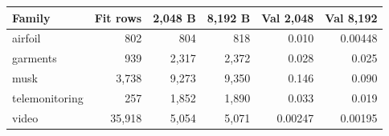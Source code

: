 \begin{tabular}{@{}lrrrrr@{}}
\toprule
Family & Fit rows & 2{,}048 B & 8{,}192 B & Val 2{,}048 & Val 8{,}192 \\
\midrule
airfoil & 802 & 804 & 818 & 0.010 & 0.00448 \\
garments & 939 & 2{,}317 & 2{,}372 & 0.028 & 0.025 \\
musk & 3{,}738 & 9{,}273 & 9{,}350 & 0.146 & 0.090 \\
telemonitoring & 257 & 1{,}852 & 1{,}890 & 0.033 & 0.019 \\
video & 35{,}918 & 5{,}054 & 5{,}071 & 0.00247 & 0.00195 \\
\bottomrule
\end{tabular}
